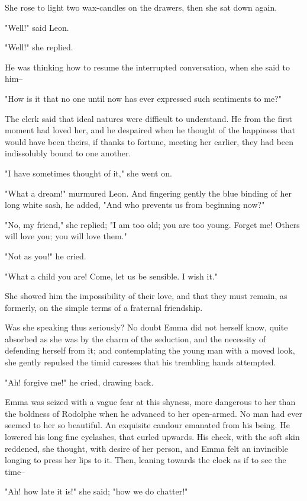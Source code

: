 \documentclass{tufte-book}
\begin{document}
She rose to light two wax-candles on the drawers, then she sat down
again.

"Well!" said Leon.

"Well!" she replied.

He was thinking how to resume the interrupted conversation, when she
said to him--

"How is it that no one until now has ever expressed such sentiments to
me?"

The clerk said that ideal natures were difficult to understand. He from
the first moment had loved her, and he despaired when he thought of the
happiness that would have been theirs, if thanks to fortune, meeting her
earlier, they had been indissolubly bound to one another.

"I have sometimes thought of it," she went on.

"What a dream!" murmured Leon. And fingering gently the blue binding of
her long white sash, he added, "And who prevents us from beginning now?"

"No, my friend," she replied; "I am too old; you are too young. Forget
me! Others will love you; you will love them."

"Not as you!" he cried.

"What a child you are! Come, let us be sensible. I wish it."

She showed him the impossibility of their love, and that they must
remain, as formerly, on the simple terms of a fraternal friendship.

Was she speaking thus seriously? No doubt Emma did not herself know,
quite absorbed as she was by the charm of the seduction, and the
necessity of defending herself from it; and contemplating the young
man with a moved look, she gently repulsed the timid caresses that his
trembling hands attempted.

"Ah! forgive me!" he cried, drawing back.

Emma was seized with a vague fear at this shyness, more dangerous to her
than the boldness of Rodolphe when he advanced to her open-armed. No man
had ever seemed to her so beautiful. An exquisite candour emanated from
his being. He lowered his long fine eyelashes, that curled upwards.
His cheek, with the soft skin reddened, she thought, with desire of her
person, and Emma felt an invincible longing to press her lips to it.
Then, leaning towards the clock as if to see the time--

"Ah! how late it is!" she said; "how we do chatter!"
\end{document}
